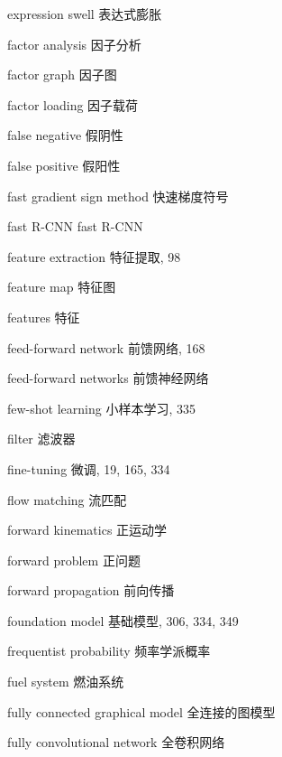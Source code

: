 expression swell 表达式膨胀\par
factor analysis 因子分析\par
factor graph 因子图\par
factor loading 因子载荷\par
false negative 假阴性\par
false positive 假阳性\par
fast gradient sign method 快速梯度符号\par
fast R-CNN fast R-CNN\par
feature extraction 特征提取, 98\par
feature map 特征图\par
features 特征\par
feed-forward network 前馈网络, 168\par
feed-forward networks 前馈神经网络\par
few-shot learning 小样本学习, 335\par
filter 滤波器\par
fine-tuning 微调, 19, 165, 334\par
flow matching 流匹配\par
forward kinematics 正运动学\par
forward problem 正问题\par
forward propagation 前向传播\par
foundation model 基础模型, 306, 334, 349\par
frequentist probability 频率学派概率\par
fuel system 燃油系统\par
fully connected graphical model 全连接的图模型\par
fully convolutional network 全卷积网络\par

